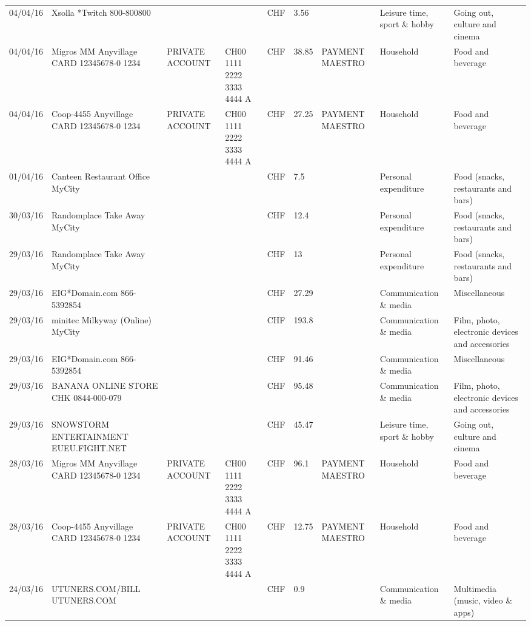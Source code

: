 \begin{landscape}
\begin{center}
\begin{longtable}{lllllllll}
		04/04/16 & Xsolla *Twitch           800-800800 &       &       & CHF   & 3.56  &       & Leisure time, sport \& hobby & Going out, culture and cinema \\
		04/04/16 & Migros MM Anyvillage CARD 12345678-0 1234 & PRIVATE ACCOUNT & CH00 1111 2222 3333 4444 A & CHF   & 38.85 & PAYMENT MAESTRO & Household & Food and beverage \\
		04/04/16 & Coop-4455 Anyvillage CARD 12345678-0 1234 & PRIVATE ACCOUNT & CH00 1111 2222 3333 4444 A & CHF   & 27.25 & PAYMENT MAESTRO & Household & Food and beverage \\
		01/04/16 & Canteen Restaurant Office      MyCity &       &       & CHF   & 7.5   &       & Personal expenditure & Food (snacks, restaurants and bars) \\
		30/03/16 & Randomplace Take Away     MyCity &       &       & CHF   & 12.4  &       & Personal expenditure & Food (snacks, restaurants and bars) \\
		29/03/16 & Randomplace Take Away     MyCity &       &       & CHF   & 13    &       & Personal expenditure & Food (snacks, restaurants and bars) \\
		29/03/16 & EIG*Domain.com           866-5392854 &       &       & CHF   & 27.29 &       & Communication \& media & Miscellaneous \\
		29/03/16 & minitec Milkyway (Online) MyCity &       &       & CHF   & 193.8 &       & Communication \& media & Film, photo, electronic devices and accessories \\
		29/03/16 & EIG*Domain.com           866-5392854 &       &       & CHF   & 91.46 &       & Communication \& media & Miscellaneous \\
		29/03/16 & BANANA ONLINE STORE CHK   0844-000-079 &       &       & CHF   & 95.48 &       & Communication \& media & Film, photo, electronic devices and accessories \\
		29/03/16 & SNOWSTORM ENTERTAINMENT EUEU.FIGHT.NET &       &       & CHF   & 45.47 &       & Leisure time, sport \& hobby & Going out, culture and cinema \\
		28/03/16 & Migros MM Anyvillage CARD 12345678-0 1234 & PRIVATE ACCOUNT & CH00 1111 2222 3333 4444 A & CHF   & 96.1  & PAYMENT MAESTRO & Household & Food and beverage \\
		28/03/16 & Coop-4455 Anyvillage CARD 12345678-0 1234 & PRIVATE ACCOUNT & CH00 1111 2222 3333 4444 A & CHF   & 12.75 & PAYMENT MAESTRO & Household & Food and beverage \\
		24/03/16 & UTUNERS.COM/BILL          UTUNERS.COM &       &       & CHF   & 0.9   &       & Communication \& media & Multimedia (music, video \& apps) \\

\end{longtable}
\end{center}
\end{landscape}
